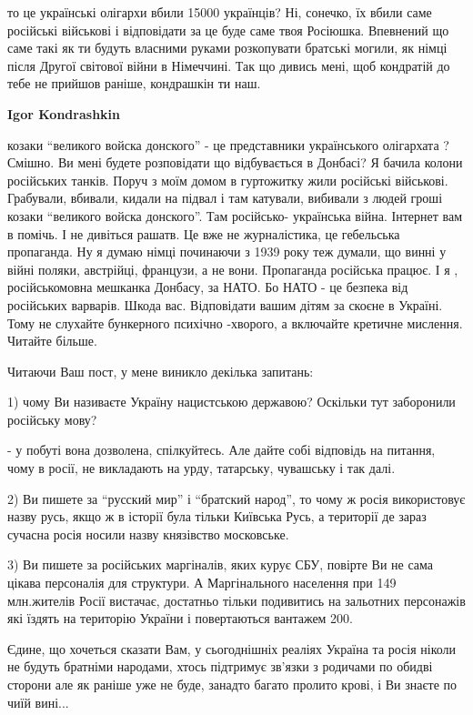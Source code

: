 \begin{itemize}
\begin{itemize}
то це українські олігархи вбили 15000 українців? Ні, сонечко, їх вбили саме
російські військові і відповідати за це буде саме твоя Росіюшка. Впевнений що
саме такі як ти будуть власними руками розкопувати братські могили, як німці
після Другої світової війни в Німеччині. Так що дивись мені, щоб кондратій до
тебе не прийшов раніше, кондрашкін ти наш.

\textbf{Igor Kondrashkin} 

козаки \enquote{великого войска донского} - це представники українського олігархата ?
Смішно. Ви мені будете розповідати що відбувається в Донбасі? Я бачила колони
російських танків. Поруч з моїм домом в гуртожитку жили російські військові.
Грабували, вбивали, кидали на підвал і там катували, вибивали з людей гроші
козаки \enquote{великого войска донского}. Там російсько- українська війна. Інтернет
вам в помічь. І не дивіться рашатв. Це вже не журналістика, це гебельська
пропаганда. Ну я думаю німці починаючи з 1939 року теж думали, що винні у
війні поляки, австрійці, французи, а не вони. Пропаганда російська працює. І я
, російськомовна мешканка Донбасу, за НАТО. Бо НАТО - це безпека від російських
варварів. Шкода вас. Відповідати вашим дітям за скоєне в Україні. Тому не
слухайте бункерного психічно -хворого, а включайте кретичне мислення. Читайте
більше.

\end{itemize} %


Читаючи Ваш пост, у мене виникло декілька запитань:

1) чому Ви називаєте Україну нацистською державою? Оскільки тут заборонили
російську мову?

- у побуті вона дозволена, спілкуйтесь. Але дайте собі відповідь на питання,
чому в росії, не викладають на урду, татарську, чувашську і так далі.

2) Ви пишете за \enquote{русский мир} і \enquote{братский народ}, то чому ж росія використовує
назву русь, якщо ж в історії була тільки Київська Русь, а території де зараз
сучасна росія носили назву князівство московське.

3) Ви пишете за російських маргіналів, яких курує СБУ, повірте Ви не сама
цікава персоналія для структури. А Маргінального населення при 149 млн.жителів
Росії вистачає, достатньо тільки подивитись на зальотних персонажів які їздять
на територію України і повертаються вантажем 200.

Єдине, що хочеться сказати Вам, у сьогоднішніх реаліях Україна та росія ніколи
не будуть братніми народами, хтось підтримує зв'язки з родичами по обидві
сторони але як раніше уже не буде, занадто багато пролито крові, і Ви знаєте по
чиїй вині...


\end{itemize}
